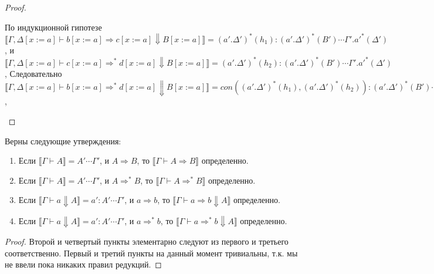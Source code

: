 \documentclass{amsart}
\theoremstyle{definition}
\theoremstyle{remark}
\newcommand{\red}{\Rightarrow}
\renewcommand{\ll}{\llbracket}
\newcommand{\rr}{\rrbracket}
\numberwithin{figure}{section}
\begin{document}
\begin{proof}
\begin{itemize}
По индукционной гипотезе $\ll \Gamma, \Delta[x := a] \vdash b[x := a] \red c[x := a] \Downarrow B[x := a] \rr = (a'.\Delta')^*(h_1) : (a'.\Delta')^*(B') \dotsb \Gamma'.a'^*(\Delta')$,
    и $\ll \Gamma, \Delta[x := a] \vdash c[x := a] \red^* d[x := a] \Downarrow B[x := a] \rr = (a'.\Delta')^*(h_2) : (a'.\Delta')^*(B') \dotsb \Gamma'.a'^*(\Delta')$,
Следовательно $\ll \Gamma, \Delta[x := a] \vdash b[x := a] \red^* d[x := a] \Downarrow B[x := a] \rr = con((a'.\Delta')^*(h_1), (a'.\Delta')^*(h_2)) : (a'.\Delta')^*(B') \dotsb \Gamma'.a'^*(\Delta') = (a'.\Delta')^*(con(h_1, h_2)) : (a'.\Delta')^*(B') \dotsb \Gamma'.a'^*(\Delta')$,

\end{itemize}
\end{proof}

\begin{lem}
Верны следующие утверждения:
\begin{enumerate}
\item Если $\ll \Gamma \vdash A \rr = A' \dotsb \Gamma'$, и $A \red B$, то $\ll \Gamma \vdash A \red B \rr$ определенно.
\item Если $\ll \Gamma \vdash A \rr = A' \dotsb \Gamma'$, и $A \red^* B$, то $\ll \Gamma \vdash A \red^* B \rr$ определенно.
\item Если $\ll \Gamma \vdash a \Downarrow A \rr = a' : A' \dotsb \Gamma'$, и $a \red b$, то $\ll \Gamma \vdash a \red b \Downarrow A \rr$ определенно.
\item Если $\ll \Gamma \vdash a \Downarrow A \rr = a' : A' \dotsb \Gamma'$, и $a \red^* b$, то $\ll \Gamma \vdash a \red^* b \Downarrow A \rr$ определенно.
\end{enumerate}
\end{lem}
\begin{proof}
Второй и четвертый пункты элементарно следуют из первого и третьего соответственно.
Первый и третий пункты на данный момент тривиальны, т.к. мы не ввели пока никаких правил редукций.
\end{proof}
\end{document}
